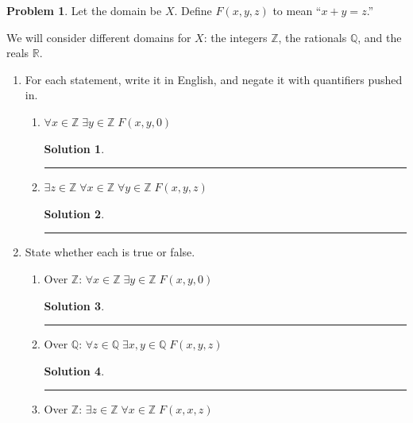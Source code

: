 \documentclass{article}
\theoremstyle{definition}
\newtheorem{problem}{Problem}
\def\fline{\rule{0.75\linewidth}{0.5pt}}
\newcommand{\finishline}{\begin{center}\fline\end{center}}
\newtheorem*{solution*}{Solution}
\newenvironment{solution}{\begin{solution*}}{{\finishline} \end{solution*}}
\begin{document}
\begin{problem}
Let the domain be $X$.   Define $F(x,y,z)$ to mean ``$x+y=z$.''  

We will consider different domains for $X$: the integers $\mathbb{Z}$, the rationals $\mathbb{Q}$, and the reals $\mathbb{R}$.

\begin{enumerate}[label=(\alph*)]
    \item For each statement, write it in English, and negate it with quantifiers pushed in.

\begin{enumerate}
  \item $\forall x \in \mathbb{Z}\; \exists y \in \mathbb{Z}\; F(x,y,0)$

  \begin{solution}



  \end{solution}
  \item $\exists z \in \mathbb{Z}\; \forall x \in \mathbb{Z}\; \forall y \in \mathbb{Z}\; F(x,y,z)$

  \begin{solution}



  \end{solution}
\end{enumerate}


\item State whether each is true or false.

\begin{enumerate}
  \item Over $\mathbb{Z}$: $\forall x \in \mathbb{Z}\; \exists y \in \mathbb{Z}\; F(x,y,0)$

  \begin{solution}



  \end{solution}
  \item Over $\mathbb{Q}$: $\forall z \in \mathbb{Q}\; \exists x,y \in \mathbb{Q}\; F(x,y,z)$

  \begin{solution}



  \end{solution}
  \item Over $\mathbb{Z}$: $\exists z \in \mathbb{Z}\; \forall x \in \mathbb{Z}\; F(x,x,z)$


\end{enumerate}
\end{enumerate}
\end{problem}
\end{document}
